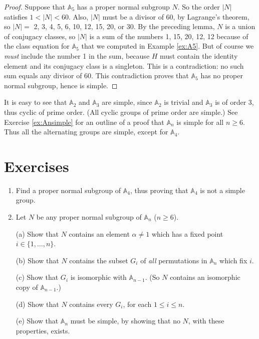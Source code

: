 \documentclass[11pt,oneside]{article}
\newenvironment{problems}
{
 \begin{enumerate}[topsep=1pt,itemsep=0pt,parsep=2pt,leftmargin=0.6cm,%
 label={\arabic*.}, ref=\arabic*] \small
}
{
 \end{enumerate}
}
\theoremstyle{definition}
\newcommand{\Alt}{\mathbb{A}}
\begin{document}
\begin{proof}
Suppose that $\Alt_5$ has a proper normal subgroup $N$. So the order
$|N|$ satisfies $1 < |N| < 60$.  Also, $|N|$ must be a divisor of 60,
by Lagrange's theorem, so $|N| = $ 2, 3, 4, 5, 6, 10, 12, 15, 20, or
30. By the preceding lemma, $N$ is a union of conjugacy classes, so
$|N|$ is a sum of the numbers 1, 15, 20, 12, 12 because of the class
equation for $\Alt_5$ that we computed in Example \ref{ex:A5}. But of
course we {\em must} include the number 1 in the sum, because $H$ must
contain the identity element and its conjugacy class is a singleton.
This is a contradiction: no such sum equals any divisor of $60$.  This
contradiction proves that $\Alt_5$ has no proper normal subgroup,
hence is simple.
\end{proof}


It is easy to see that $\Alt_2$ and $\Alt_3$ are simple, since
$\Alt_2$ is trivial and $\Alt_3$ is of order 3, thus cyclic of prime
order. (All cyclic groups of prime order are simple.)  See Exercise
\ref{ex:Ansimple} for an outline of a proof that $\Alt_n$ is simple
for all $n\ge 6$. Thus all the alternating groups are simple, except
for $\Alt_4$.


\section*{Exercises}
\begin{problems}
  

\item Find a proper normal subgroup of $\Alt_4$, thus proving that
  $\Alt_4$ is not a simple group.

\item\index{simplicity of $\Alt_n$} \label{ex:Ansimple} Let $N$ be any
  proper normal subgroup of $\Alt_n$ ($n\ge 6$).

(a) Show that $N$ contains an element $\alpha \ne 1$ which has a
fixed point $i \in \{1,\dots, n\}$.

(b) Show that $N$ contains the subset $G_i$ of {\em all} permutations
in $\Alt_n$ which fix $i$.

(c) Show that $G_i$ is isomorphic with $\Alt_{n-1}$. (So $N$ contains
an isomorphic copy of $\Alt_{n-1}$.)

(d) Show that $N$ contains every $G_i$, for each $1 \le i \le n$.

(e) Show that $\Alt_n$ must be simple, by showing that no $N$, with
these properties, exists.




\end{problems}
\end{document}
